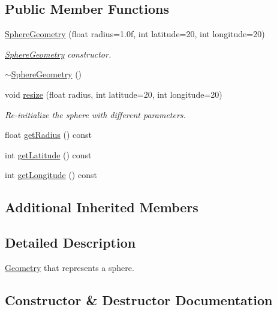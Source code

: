 \subsection*{Public Member Functions}
\begin{DoxyCompactItemize}
\item 
\mbox{\hyperlink{classec_1_1_sphere_geometry_a42ece383849cd3ab23f65a40cdf370af}{Sphere\+Geometry}} (float radius=1.\+0f, int latitude=20, int longitude=20)
\begin{DoxyCompactList}\small\item\em \mbox{\hyperlink{classec_1_1_sphere_geometry}{Sphere\+Geometry}} constructor. \end{DoxyCompactList}\item 
\mbox{\hyperlink{classec_1_1_sphere_geometry_a67044e9d2bb86448165de2ae1c62b7f7}{$\sim$\+Sphere\+Geometry}} ()
\item 
void \mbox{\hyperlink{classec_1_1_sphere_geometry_a44eb0096b6f9c6a98a7c325032c04c41}{resize}} (float radius, int latitude=20, int longitude=20)
\begin{DoxyCompactList}\small\item\em Re-\/initialize the sphere with different parameters. \end{DoxyCompactList}\item 
float \mbox{\hyperlink{classec_1_1_sphere_geometry_a297fbaec8341dbb2dd0023b0d90d4e24}{get\+Radius}} () const
\item 
int \mbox{\hyperlink{classec_1_1_sphere_geometry_a44bb07ae4243b721d7542fb8fe30a9a7}{get\+Latitude}} () const
\item 
int \mbox{\hyperlink{classec_1_1_sphere_geometry_a57803f9dc144ba93a300091561a93f07}{get\+Longitude}} () const
\end{DoxyCompactItemize}
\subsection*{Additional Inherited Members}


\subsection{Detailed Description}
\mbox{\hyperlink{classec_1_1_geometry}{Geometry}} that represents a sphere. 

\subsection{Constructor \& Destructor Documentation}
\mbox{\label{classec_1_1_sphere_geometry_a42ece383849cd3ab23f65a40cdf370af}} 
